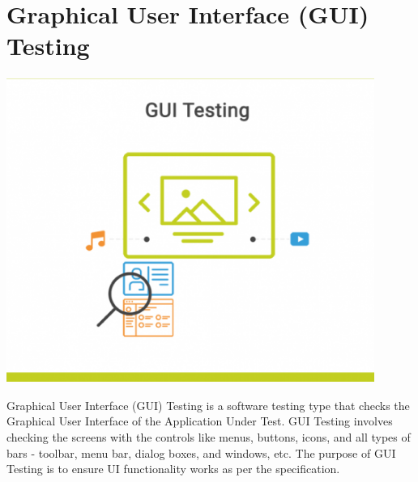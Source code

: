 \section{Graphical User Interface (GUI) Testing}
\begin{center}
    \includegraphics[width=12cm,height=10cm,keepaspectratio]{images/gui_testing}
\end{center}
Graphical User Interface (GUI) Testing is a software testing type that checks
the Graphical User Interface of the Application Under Test. GUI Testing involves
checking the screens with the controls like menus, buttons, icons, and all types
of bars - toolbar, menu bar, dialog boxes, and windows, etc. The purpose of GUI 
Testing is to ensure UI functionality works as per the specification.

